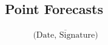 \documentclass[11pt,a4paper]{article}
\begin{document}
\newpage


\pagestyle{fancy}						
\fancyhf{}								
\fancyhead[R]{}							 
\renewcommand{\headrulewidth}{0pt}	 
\fancyfoot[R]{\thepage}				 
\renewcommand{\footrulewidth}{0pt}	 
\setcounter{page}{5}
\newpage\clearpage

\newpage




\begin{appendices}
\chapter{Point Forecasts}
\label{app:point-forecasts}

\end{appendices}

\newpage

\begin{flushright}
$\overline{~~~~~~~~~~~~~~~\mbox{(Date, Signature)}~~~~~~~~~~~~~~~}$
\end{flushright}
\end{document}
